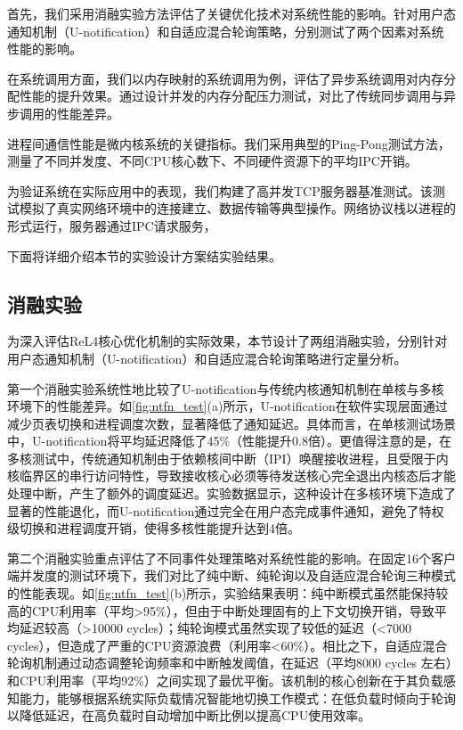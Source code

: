 首先，我们采用消融实验方法评估了关键优化技术对系统性能的影响。针对用户态通知机制（U-notification）和自适应混合轮询策略，分别测试了两个因素对系统性能的影响。

在系统调用方面，我们以内存映射的系统调用为例，评估了异步系统调用对内存分配性能的提升效果。通过设计并发的内存分配压力测试，对比了传统同步调用与异步调用的性能差异。

进程间通信性能是微内核系统的关键指标。我们采用典型的Ping-Pong测试方法，测量了不同并发度、不同CPU核心数下、不同硬件资源下的平均IPC开销。

为验证系统在实际应用中的表现，我们构建了高并发TCP服务器基准测试。该测试模拟了真实网络环境中的连接建立、数据传输等典型操作。网络协议栈以进程的形式运行，服务器通过IPC请求服务，

下面将详细介绍本节的实验设计方案结实验结果。

\subsection{消融实验}
为深入评估ReL4核心优化机制的实际效果，本节设计了两组消融实验，分别针对用户态通知机制（U-notification）和自适应混合轮询策略进行定量分析。

第一个消融实验系统性地比较了U-notification与传统内核通知机制在单核与多核环境下的性能差异。如\ref{fig:ntfn_test}(a)所示，U-notification在软件实现层面通过减少页表切换和进程调度次数，显著降低了通知延迟。具体而言，在单核测试场景中，U-notification将平均延迟降低了45\%（性能提升0.8倍）。更值得注意的是，在多核测试中，传统通知机制由于依赖核间中断（IPI）唤醒接收进程，且受限于内核临界区的串行访问特性，导致接收核心必须等待发送核心完全退出内核态后才能处理中断，产生了额外的调度延迟。实验数据显示，这种设计在多核环境下造成了显著的性能退化，而U-notification通过完全在用户态完成事件通知，避免了特权级切换和进程调度开销，使得多核性能提升达到4倍。

第二个消融实验重点评估了不同事件处理策略对系统性能的影响。在固定16个客户端并发度的测试环境下，我们对比了纯中断、纯轮询以及自适应混合轮询三种模式的性能表现。如\ref{fig:ntfn_test}(b)所示，实验结果表明：纯中断模式虽然能保持较高的CPU利用率（平均>95\%），但由于中断处理固有的上下文切换开销，导致平均延迟较高（>10000 cycles）；纯轮询模式虽然实现了较低的延迟（<7000 cycles），但造成了严重的CPU资源浪费（利用率<60\%）。相比之下，自适应混合轮询机制通过动态调整轮询频率和中断触发阈值，在延迟（平均8000 cycles 左右）和CPU利用率（平均92\%）之间实现了最优平衡。该机制的核心创新在于其负载感知能力，能够根据系统实际负载情况智能地切换工作模式：在低负载时倾向于轮询以降低延迟，在高负载时自动增加中断比例以提高CPU使用效率。

